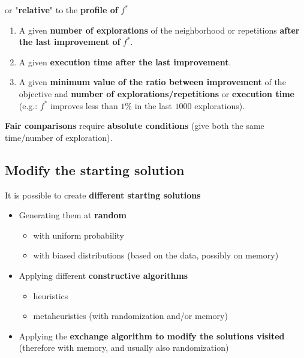 or "\textbf{relative}" to the \textbf{profile of} $f^\ast$
\begin{enumerate}
	\item A given \textbf{number of explorations} of the neighborhood or repetitions \textbf{after the last improvement of} $f^\ast$.\\
	
	\item A given \textbf{execution time after the last improvement}.\\
	
	\item A given \textbf{minimum value of the ratio between improvement} of the objective and \textbf{number of explorations/repetitions} or \textbf{execution time} (e.g.: $f^\ast$ improves less than $1\%$ in the last $1000$ explorations).\\
\end{enumerate}

\textbf{Fair comparisons} require \textbf{absolute conditions} (give both the same time/number of exploration).\\

\newpage

\subsection{Modify the starting solution}

It is possible to create \textbf{different starting solutions}
\begin{itemize}
	\item Generating them at \textbf{random}
	\begin{itemize}
		\item with uniform probability
		\item with biased distributions (based on the data, possibly on memory)
	\end{itemize}
	\nn
	
	\item Applying different \textbf{constructive algorithms}
	\begin{itemize}
		\item heuristics
		\item metaheuristics (with randomization and/or memory)
	\end{itemize}
	\nn
	
	\item Applying the \textbf{exchange algorithm to modify the solutions visited} (therefore with memory, and usually also randomization)
\end{itemize}

